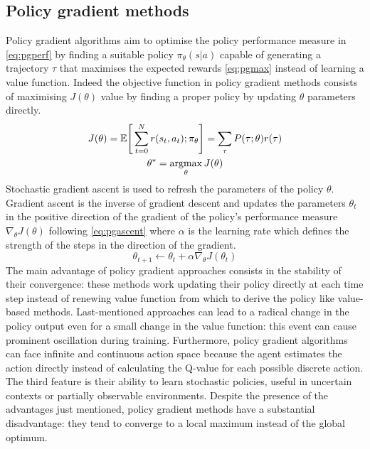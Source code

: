 \subsection{Policy gradient methods}

Policy gradient algorithms aim to optimise the policy performance measure in \vref{eq:pgperf} by finding a suitable policy $\pi_\theta(s|a)$ capable of generating a trajectory $\tau$ that maximises the expected rewards \vref{eq:pgmax} instead of learning a  value function.
Indeed the objective function in policy gradient methods consists of maximising $J(\theta)$ value by finding a proper policy by updating $\theta$ parameters directly.
\begin{gather}
	J(\theta) = \mathbb{E}\Bigg[\sum_{t=0}^{N}r(s_t,a_t); \pi_\theta\Bigg] = \sum_{\tau}P(\tau;\theta)r(\tau) \label{eq:pgperf}\\
	\theta^* = \operatornamewithlimits{argmax}_\theta J(\theta) \label{eq:pgmax}
\end{gather}
Stochastic gradient ascent is used to refresh the parameters of the policy $\theta$.
Gradient ascent is the inverse of gradient descent and updates the parameters $\theta_t$ in the positive direction of the gradient of the policy’s performance measure $\nabla_\theta J(\theta)$ following \vref{eq:pgascent} where $\alpha$ is the learning rate which defines the strength of the steps in the direction of the gradient.
\begin{equation}
	\theta_{t+1} \leftarrow \theta_t + \alpha \nabla_\theta J(\theta_t) \label{eq:pgascent}
\end{equation}
The main advantage of policy gradient approaches consists in the stability of their convergence: these methods work updating their policy directly at each time step instead of renewing value function from which to derive the policy like value-based methods.
Last-mentioned approaches can lead to a radical change in the policy output even for a small change in the value function: this event can cause prominent oscillation during training.
Furthermore, policy gradient algorithms can face infinite and continuous action space because the agent estimates the action directly instead of calculating the Q-value for each possible discrete action.
The third feature is their ability to learn stochastic policies, useful in uncertain contexts or partially observable environments.
Despite the presence of the advantages just mentioned, policy gradient methods have a substantial disadvantage: they tend to converge to a local maximum instead of the global optimum.

